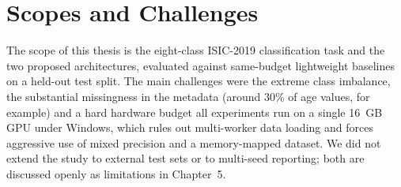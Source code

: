 \section{Scopes and Challenges}

The scope of this thesis is the eight-class ISIC-2019 classification task and
the two proposed architectures, evaluated against same-budget lightweight
baselines on a held-out test split. The main challenges were the extreme class
imbalance, the substantial missingness in the metadata (around 30\% of age
values, for example) and a hard hardware budget all experiments run on a
single 16~GB GPU under Windows, which rules out multi-worker data loading and
forces aggressive use of mixed precision and a memory-mapped dataset. We did not
extend the study to external test sets or to multi-seed reporting; both are
discussed openly as limitations in Chapter~5.


